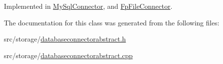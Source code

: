 Implemented in \mbox{\hyperlink{classMySqlConnector_a528aac591ea56ade27a096bb997abb2a}{My\+Sql\+Connector}}, and \mbox{\hyperlink{classFpFileConnector_a57c6eafd6b4c7dfbd927f6d4cb63d25c}{Fp\+File\+Connector}}.



The documentation for this class was generated from the following files\+:\begin{DoxyCompactItemize}
\item 
src/storage/\mbox{\hyperlink{databaseconnectorabstract_8h}{databaseconnectorabstract.\+h}}\item 
src/storage/\mbox{\hyperlink{databaseconnectorabstract_8cpp}{databaseconnectorabstract.\+cpp}}\end{DoxyCompactItemize}
